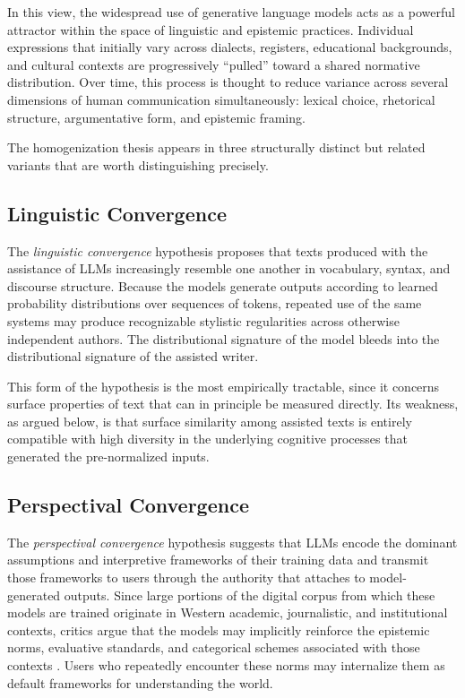 \documentclass[12pt,a4paper]{article}
\theoremstyle{definition}
\theoremstyle{plain}
\theoremstyle{remark}
\begin{document}
In this view, the widespread use of generative language models acts as a powerful attractor
within the space of linguistic and epistemic practices. Individual expressions that initially
vary across dialects, registers, educational backgrounds, and cultural contexts are
progressively ``pulled'' toward a shared normative distribution. Over time, this process is
thought to reduce variance across several dimensions of human communication simultaneously:
lexical choice, rhetorical structure, argumentative form, and epistemic framing.

The homogenization thesis appears in three structurally distinct but related variants that
are worth distinguishing precisely.

\subsection{Linguistic Convergence}

The \emph{linguistic convergence} hypothesis proposes that texts produced with the assistance
of LLMs increasingly resemble one another in vocabulary, syntax, and discourse structure.
Because the models generate outputs according to learned probability distributions over
sequences of tokens, repeated use of the same systems may produce recognizable stylistic
regularities across otherwise independent authors. The distributional signature of the model
bleeds into the distributional signature of the assisted writer.

This form of the hypothesis is the most empirically tractable, since it concerns surface
properties of text that can in principle be measured directly. Its weakness, as argued below,
is that surface similarity among assisted texts is entirely compatible with high diversity in
the underlying cognitive processes that generated the pre-normalized inputs.

\subsection{Perspectival Convergence}

The \emph{perspectival convergence} hypothesis suggests that LLMs encode the dominant
assumptions and interpretive frameworks of their training data and transmit those frameworks
to users through the authority that attaches to model-generated outputs. Since large portions
of the digital corpus from which these models are trained originate in Western academic,
journalistic, and institutional contexts, critics argue that the models may implicitly
reinforce the epistemic norms, evaluative standards, and categorical schemes associated with
those contexts \citep{bender2021}. Users who repeatedly encounter these norms may
internalize them as default frameworks for understanding the world.
\end{document}
